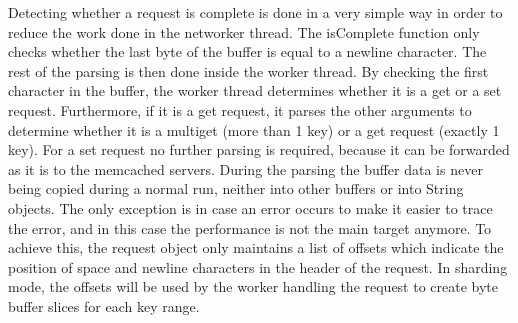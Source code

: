 \documentclass[11pt,a4paper]{article}
\begin{document}
Detecting whether a request is complete is done in a very simple way in order to reduce the work done in the networker thread.
The isComplete function only checks whether the last byte of the buffer is equal to a newline character.
The rest of the parsing is then done inside the worker thread. By checking the first character in the buffer, the worker thread determines whether it is a get or a set request.
Furthermore, if it is a get request, it parses the other arguments to determine whether it is a multiget (more than 1 key) or a get request (exactly 1 key).
For a set request no further parsing is required, because it can be forwarded as it is to the memcached servers.
During the parsing the buffer data is never being copied during a normal run, neither into other buffers or into String objects.
The only exception is in case an error occurs to make it easier to trace the error, and in this case the performance is not the main target anymore.
To achieve this, the request object only maintains a list of offsets which indicate the position of space and newline characters in the header of the request.
In sharding mode, the offsets will be used by the worker handling the request to create byte buffer slices for each key range.
\end{document}
